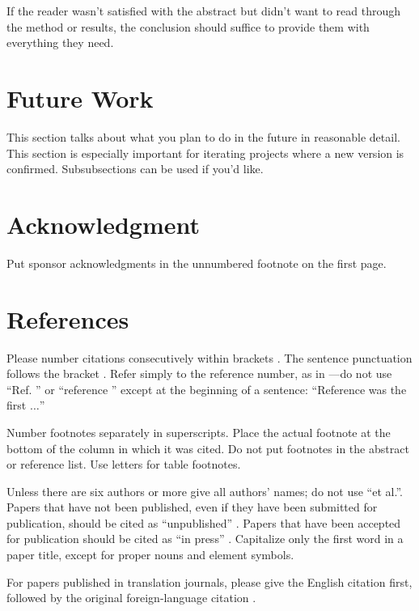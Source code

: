 \documentclass[conference]{IEEEtran}
\begin{document}
If the reader wasn't satisfied with the abstract but didn't want to read through the method or results, the conclusion should suffice to provide them with everything they need.

\section{Future Work}
This section talks about what you plan to do in the future in reasonable detail. This   section is especially important for iterating projects where a new version is confirmed. Subsubsections can be used if you'd like.



\section*{Acknowledgment} %

Put sponsor acknowledgments in the unnumbered footnote on the first page.

\section*{References} %

Please number citations consecutively within brackets \cite{b1}. The 
sentence punctuation follows the bracket \cite{b2}. Refer simply to the reference 
number, as in \cite{b3}---do not use ``Ref. \cite{b3}'' or ``reference \cite{b3}'' except at 
the beginning of a sentence: ``Reference \cite{b3} was the first $\ldots$''

Number footnotes separately in superscripts. Place the actual footnote at 
the bottom of the column in which it was cited. Do not put footnotes in the 
abstract or reference list. Use letters for table footnotes.

Unless there are six authors or more give all authors' names; do not use 
``et al.''. Papers that have not been published, even if they have been 
submitted for publication, should be cited as ``unpublished'' \cite{b4}. Papers 
that have been accepted for publication should be cited as ``in press'' \cite{b5}. 
Capitalize only the first word in a paper title, except for proper nouns and 
element symbols.

For papers published in translation journals, please give the English 
citation first, followed by the original foreign-language citation \cite{b6}.
\end{document}

